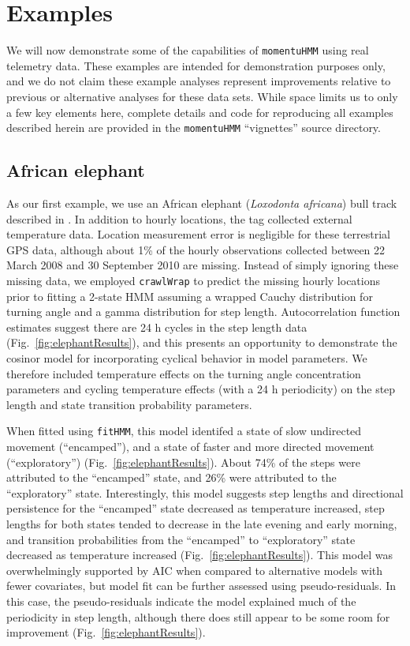 \documentclass[12pt]{article}\usepackage[]{graphicx}\usepackage[]{color}
\begin{document}
\section{Examples}
\label{sec:example}
We will now demonstrate some of the capabilities of \verb|momentuHMM| using real telemetry data. These examples are intended for demonstration purposes only, and we do not claim these example analyses represent improvements relative to previous or alternative analyses for these data sets. While space limits us to only a few key elements here, complete details and code for reproducing all examples described herein are provided in the \verb|momentuHMM| ``vignettes'' source directory.


\subsection{African elephant}
\label{sec:elephant}
As our first example, we use an African elephant ({\it Loxodonta africana}) bull track described in \cite{WallEtAl2014}%
. In addition to hourly locations, the tag collected external temperature data. Location measurement error is negligible for these terrestrial GPS data, although about 1\% of the hourly observations collected between 22 March 2008 and 30 September 2010 are missing. Instead of simply ignoring these missing data, we employed \verb|crawlWrap| to predict the missing hourly locations prior to fitting a 2-state HMM assuming a wrapped Cauchy distribution for turning angle and a gamma distribution for step length. Autocorrelation function estimates suggest there are 24 h cycles in the step length data (Fig.\ \ref{fig:elephantResults}), and this presents an opportunity to demonstrate the cosinor model for incorporating cyclical behavior in model parameters. We therefore included temperature effects on the turning angle concentration parameters and cycling temperature effects (with a 24 h periodicity) on the step length and state transition probability parameters. 

When fitted using \verb|fitHMM|, this model identifed a state of slow undirected movement (``encamped''), and a state of faster and more directed movement (``exploratory'') (Fig.\ \ref{fig:elephantResults}). About 74\% of the steps were attributed to the ``encamped'' state, and 26\% were attributed to the ``exploratory'' state. Interestingly, this model suggests step lengths and directional persistence for the ``encamped'' state decreased as temperature increased, step lengths for both states tended to decrease in the late evening and early morning, and transition probabilities from the ``encamped'' to ``exploratory'' state decreased as temperature increased (Fig.\ \ref{fig:elephantResults}). This model was overwhelmingly supported by AIC when compared to alternative models with fewer covariates, but model fit can be further assessed using pseudo-residuals.  In this case, the pseudo-residuals indicate the model explained much of the periodicity in step length, although there does still appear to be some room for improvement (Fig.\ \ref{fig:elephantResults}).
\end{document}
